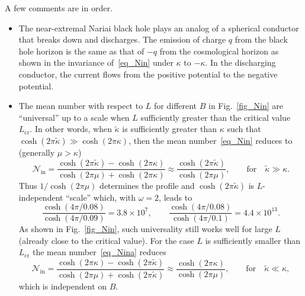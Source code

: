 \documentclass[aps,nofootinbib,superscriptaddress
]{revtex4}
\begin{document}
A few comments are in order.
\begin{itemize}
\item The near-extremal Nariai black hole plays an analog of a spherical conductor that breaks down and discharges. The emission of charge $q$ from the black hole horizon is the same as that of $-q$ from the cosmological horizon as shown in the invariance of~\eqref{eq_Nin} under $\kappa$ to $-\kappa$. In the discharging conductor, the current flows from the positive potential to the negative potential.

\item The mean number with respect to $L$ for different $B$ in Fig.~\ref{fig_Nin} are ``universal'' up to a scale when $L$ sufficiently greater than the critical value $L_\mathrm{cr}$. In other words, when $\tilde\kappa$ is sufficiently greater than $\kappa$ such that $\cosh(2 \pi \tilde\kappa) \gg \cosh(2 \pi \kappa)$, then the mean number~\eqref{eq_Nin} reduces to (generally $\mu > \kappa$)
    \begin{equation} \label{eq_Nin1}
    \mathcal{N}_\mathrm{in} = \frac{\cosh(2 \pi \tilde{\kappa}) - \cosh(2 \pi \kappa)}{\cosh(2 \pi \mu) + \cosh(2 \pi \kappa)} \approx \frac{\cosh(2 \pi \tilde{\kappa})}{\cosh(2 \pi \mu)}, \qquad \mathrm{for} \quad \tilde{\kappa} \gg \kappa.
    \end{equation}
    Thus $1/\cosh(2 \pi \mu)$ determines the profile and $\cosh(2 \pi \tilde{\kappa})$ is $L$-independent ``scale'' which, with $\omega = 2$, leads to
    $$ \frac{\cosh(4 \pi/0.08)}{\cosh(4 \pi/0.09)} = 3.8 \times 10^7, \qquad \frac{\cosh(4 \pi/0.08)}{\cosh(4 \pi/0.1)} = 4.4 \times 10^{13}. $$
    As shown in Fig.~\ref{fig_Nin}, such universality still works well for large $L$ (already close to the critical value). For the case $L$ is sufficiently smaller than $L_\mathrm{cr}$ the mean number~\eqref{eq_Nina} reduces
    \begin{equation} \label{eq_Nin2}
    \mathcal{N}_\mathrm{in} = \frac{\cosh(2 \pi \kappa) - \cosh(2 \pi \tilde{\kappa})}{\cosh(2 \pi \mu) + \cosh(2 \pi \tilde{\kappa})} \approx \frac{\cosh(2 \pi \kappa)}{\cosh(2 \pi \mu)}, \qquad \mathrm{for} \quad \tilde{\kappa} \ll \kappa,
    \end{equation}
    which is independent on $B$. 


\end{itemize}
\end{document}
